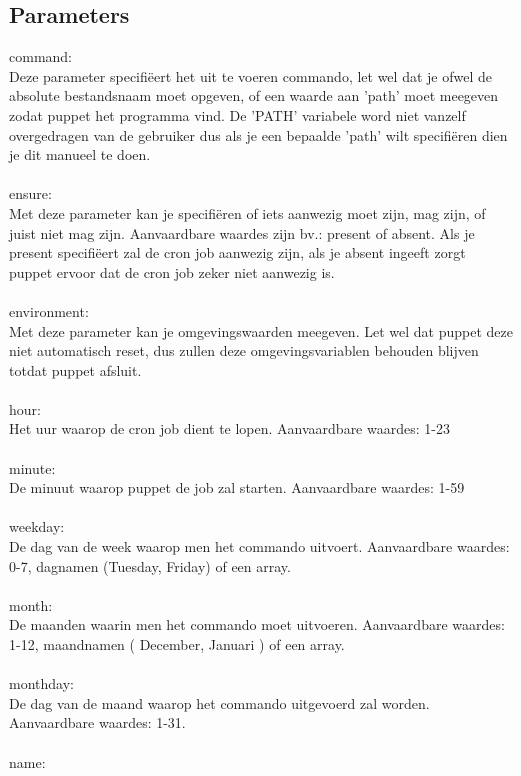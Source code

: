 \subsection{Parameters}
command:\\
Deze parameter specifi\"{e}ert het uit te voeren commando, let wel dat je ofwel de absolute bestandsnaam moet opgeven, of een waarde aan 'path' moet meegeven zodat puppet het programma vind. De 'PATH' variabele word niet vanzelf overgedragen van de gebruiker dus als je een bepaalde 'path' wilt specifi\"{e}ren dien je dit manueel te doen.\\\\
%
ensure:\\
Met deze parameter kan je specifi\"{e}ren of iets aanwezig moet zijn, mag zijn, of juist niet mag zijn. Aanvaardbare waardes zijn bv.: present of absent. Als je present specifi\"{e}ert zal de cron job aanwezig zijn, als je absent ingeeft zorgt puppet ervoor dat de cron job zeker niet aanwezig is.\\\\
%
environment:\\
Met deze parameter kan je omgevingswaarden meegeven. Let wel dat puppet deze niet automatisch reset, dus zullen deze omgevingsvariablen behouden blijven totdat puppet afsluit.\\\\
%
hour:\\
Het uur waarop de cron job dient te lopen. Aanvaardbare waardes: 1-23\\\\
%
minute:\\
De minuut waarop puppet de job zal starten. Aanvaardbare waardes: 1-59\\\\
%
weekday:\\
De dag van de week waarop men het commando uitvoert. Aanvaardbare waardes: 0-7, dagnamen (Tuesday, Friday) of een array.\\\\
%
month:\\
De maanden waarin men het commando moet uitvoeren. Aanvaardbare waardes: 1-12, maandnamen ( December, Januari ) of een array.\\\\
%
monthday:\\
De dag van de maand waarop het commando uitgevoerd zal worden. Aanvaardbare waardes: 1-31.\\\\
%
name:\\

